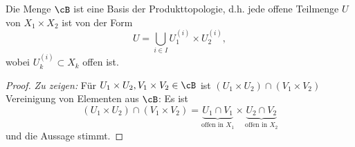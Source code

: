 \documentclass[language=ngerman]{TemplateLecture} %
\begin{document}
\begin{remark}
    Die Menge $\cB$ ist eine Basis der Produkttopologie, d.h. jede offene Teilmenge $U$ von $X_1 \times X_2$ ist von der Form
    \begin{equation*}
        U = \bigcup_{i \in I} U_1^{(i)} \times U_2^{(i)},
    \end{equation*}
    wobei $U_k^{(i)} \subset X_k$ offen ist.
\end{remark}
\begin{proof}
    \emph{Zu zeigen:} Für $U_1 \times U_2, V_1 \times V_2 \in \cB$ ist $(U_1 \times U_2) \cap (V_1 \times V_2)$ Vereinigung von Elementen aus $\cB$: Es ist 
    \begin{equation*}
        (U_1 \times U_2) \cap (V_1 \times V_2) = \underset{\text{offen in $X_1$}}{\underbrace{U_1 \cap V_1}} \times \underset{\text{offen in $X_2$}}{\underbrace{U_2 \cap V_2}}
    \end{equation*}
    und die Aussage stimmt.
\end{proof}
\end{document}
